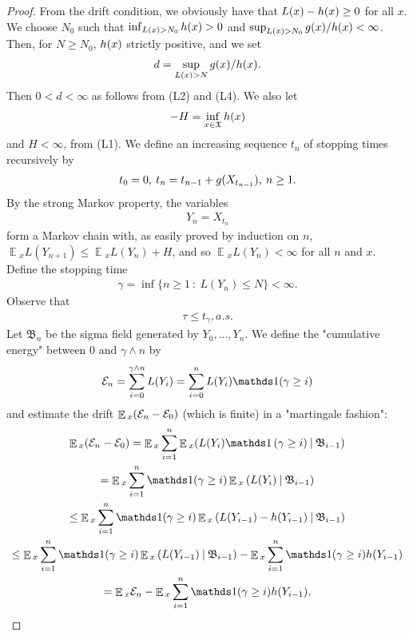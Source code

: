 \documentclass[10pt, reqno]{amsart}
\theoremstyle{definition}
\newcommand{\asaVar}{\mathfrak{B}} %
\newcommand{\astVar}{\tau} %
\newcommand{\ltfVar}{L} %
\newcommand{\assVar}{\mathfrak{X}} %
\DeclareMathOperator*{\E}{\mathbb{E}}
\begin{document}
	\begin{proof}
		From the drift condition, we obviously have that $\ltfVar(x) - \hffVar(x) \geq 0$ for all $x$. We choose $N_{0}$ such that $\inf_{\ltfVar(x) > N_{0}}\hffVar(x) > 0$ and $\sup_{\ltfVar(x) > N_{0}}\gffVar(x)/\hffVar(x) < \infty$. Then, for $N \geq N_{0}$, $h(x)$ strictly positive, and we set
		\begin{gather*}
		d = \sup_{\ltfVar(x) > N}\gffVar(x)/\hffVar(x).
		\end{gather*}
		Then $0 < d < \infty$ as follows from (L2) and (L4). We also let
		\begin{gather*}
		-H = \inf_{x \in \assVar}\hffVar(x)
		\end{gather*}
		and $H < \infty$, from (L1). We define an increasing sequence $t_{n}$ of stopping times recursively by
		\begin{gather*}
		t_{0} = 0, \: t_{n} = t_{n-1} + g(X_{t_{n-1}}), \: n \geq 1.
		\end{gather*}
		By the strong Markov property, the variables
		\begin{gather*}
		Y_{n} = X_{t_{n}}
		\end{gather*}
		form a Markov chain with, as easily proved by induction on $n$, $\E{}_{x}\ltfVar(Y_{n+1}) \leq \E{}_{x}\ltfVar(Y_{n}) + H$, and so $\E{}_{x}\ltfVar(Y_{n}) < \infty$ for all $n$ and $x$. Define the stopping time
		\begin{gather*}
		\gamma = \inf\{n \geq 1 \: : \: \ltfVar(Y_{n}) \leq N\} < \infty.
		\end{gather*}
		Observe that
		\begin{gather*}
		\astVar \leq t_{\gamma}, a.s.
		\end{gather*}
		Let $\asaVar_{n}$ be the sigma field generated by $Y_{0},..., Y_{n}$. We define the "cumulative energy"$ $ between 0 and $\gamma \wedge n$ by
		\begin{gather*}
		\cefVar_{n} = \sum_{i=0}^{\gamma \wedge n}\ltfVar(Y_{i}) = \sum_{i=0}^{n}\ltfVar(Y_{i})\indicator(\gamma \geq i)
		\end{gather*}
		and estimate the drift $\E{}_{x}(\cefVar_{n} - \cefVar_{0})$ (which is finite) in a "martingale fashion":
		\begin{gather*}
		\E{}_{x}(\cefVar_{n} - \cefVar_{0}) = \E{}_{x}\sum_{i=1}^{n}\E{}_{x}(\ltfVar(Y_{i})\indicator\left(\gamma \geq i) \: | \: \asaVar_{i-1}\right) \\= \E{}_{x}\sum_{i=1}^{n}\indicator(\gamma \geq i)\E{}_{x}\left(\ltfVar(Y_{i}) \: | \: \asaVar_{i-1}\right) \\ \leq \E{}_{x}\sum_{i=1}^{n}\indicator(\gamma \geq i)\E{}_{x}\left(\ltfVar(Y_{i-1}) - \hffVar(Y_{i-1}) \: | \: \asaVar_{i-1}\right) \\ \leq \E{}_{x}\sum_{i=1}^{n}\indicator(\gamma \geq i)\E{}_{x}\left(\ltfVar(Y_{i-1}) \: | \: \asaVar_{i-1}\right) -\E{}_{x}\sum_{i=1}^{n}\indicator(\gamma \geq i)\hffVar(Y_{i-1}) \\ = \E{}_{x}\cefVar_{n} - \E{}_{x}\sum_{i=1}^{n}\indicator(\gamma \geq i)\hffVar(Y_{i-1}),

\end{gather*}
\end{proof}
\end{document}
